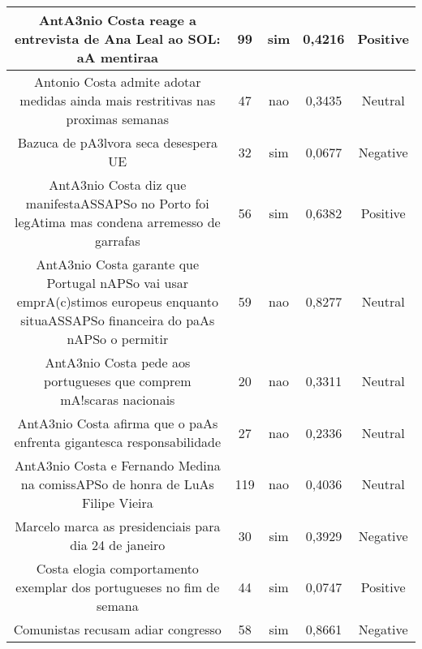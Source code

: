 \documentclass[11pt]{article}
\newlength\mylength
\begin{document}
\begin{center}
\begin{longtable}{||C{.40\mylength}||C{.20\mylength}||C{.20\mylength}||C{.30\mylength}||C{.20\mylength}||}
   AntA3nio Costa reage a entrevista de Ana Leal ao SOL: aA mentiraa  & 99 & sim & 0,4216 & Positive \\  \hline
   Antonio Costa admite adotar medidas ainda mais restritivas nas proximas semanas  & 47 & nao & 0,3435 & Neutral \\  \hline
   Bazuca de pA3lvora seca desespera UE  & 32 & sim & 0,0677 & Negative \\  \hline
   AntA3nio Costa diz que manifestaASSAPSo no Porto foi legAtima mas condena arremesso de garrafas  & 56 & sim & 0,6382 & Positive \\  \hline
   AntA3nio Costa garante que Portugal nAPSo vai usar emprA(c)stimos europeus enquanto situaASSAPSo financeira do paAs nAPSo o permitir  & 59 & nao & 0,8277 & Neutral \\  \hline
   AntA3nio Costa pede aos portugueses que comprem mA!scaras nacionais  & 20 & nao & 0,3311 & Neutral \\  \hline
   AntA3nio Costa afirma que o paAs enfrenta gigantesca responsabilidade  & 27 & nao & 0,2336 & Neutral \\  \hline
   AntA3nio Costa e Fernando Medina na comissAPSo de honra de LuAs Filipe Vieira  & 119 & nao & 0,4036 & Neutral \\  \hline
   Marcelo marca as presidenciais para dia 24 de janeiro  & 30 & sim & 0,3929 & Negative \\  \hline
   Costa elogia comportamento exemplar dos portugueses no fim de semana  & 44 & sim & 0,0747 & Positive \\  \hline
   Comunistas recusam adiar congresso  & 58 & sim & 0,8661 & Negative \\  \hline

\end{longtable}
\end{center}
\end{document}
